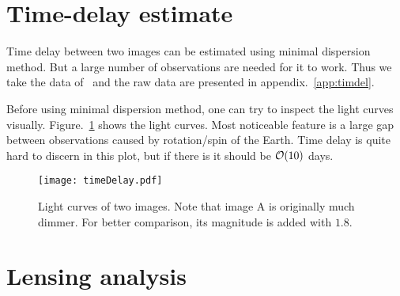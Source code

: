 \section{Time-delay estimate} 
Time delay between two images can be estimated using minimal dispersion method. But a large number of observations are needed for it to work. Thus we take the data of~\cite{vuissoz} and the raw data are presented in appendix.~\ref{app:timdel}.

Before using minimal dispersion method, one can try to inspect the light curves visually. Figure.~\ref{fig:timeDelay} shows the light curves. Most noticeable feature is a large gap between observations caused by rotation/spin of the Earth. Time delay is quite hard to discern in this plot, but if there is it should be $\order{10}$ days.
\begin{figure}[ht]
	\centering
	\texttt{[image: timeDelay.pdf]}
	\caption{Light curves of two images. Note that image A is originally much dimmer. For better comparison, its magnitude is added with $1.8$.}%
	\label{fig:timeDelay}
\end{figure}

\section{Lensing analysis}

